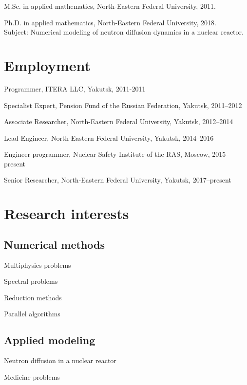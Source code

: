 \documentclass[a4paper]{article}
\renewenvironment{itemize}{
  \begin{list}{}{
    \setlength{\leftmargin}{1.5em}
  }
}{
  \end{list}
}
\begin{document}
\begin{itemize}

  \item M.Sc. in applied mathematics, North-Eastern Federal University, 2011.
  
  \item Ph.D. in applied mathematics,  North-Eastern Federal University, 2018. \\ Subject: Numerical modeling of neutron diffusion dynamics in a nuclear reactor.
\end{itemize}

\section*{Employment}

\begin{itemize}
\item Programmer, ITERA LLC, Yakutsk, 2011-2011
\item Specialist Expert, Pension Fund of the Russian Federation, Yakutsk, 2011--2012
\item Associate Researcher, North-Eastern Federal University, Yakutsk, 2012--2014
\item Lead Engineer, North-Eastern Federal University, Yakutsk, 2014--2016
\item Engineer programmer, Nuclear Safety Institute of the RAS, Moscow, 2015--present
\item Senior Researcher, North-Eastern Federal University, Yakutsk, 2017--present
\end{itemize}

\section*{Research interests}

\subsection*{Numerical methods}
\begin{itemize}
\item{Multiphysics problems}
\item{Spectral problems} 
\item{Reduction methods}
\item{Parallel algorithms}
\end{itemize}
\subsection*{Applied modeling}
\begin{itemize}
 \item Neutron diffusion in  a nuclear reactor 
 \item Medicine problems
\end{itemize} 
\end{document}
